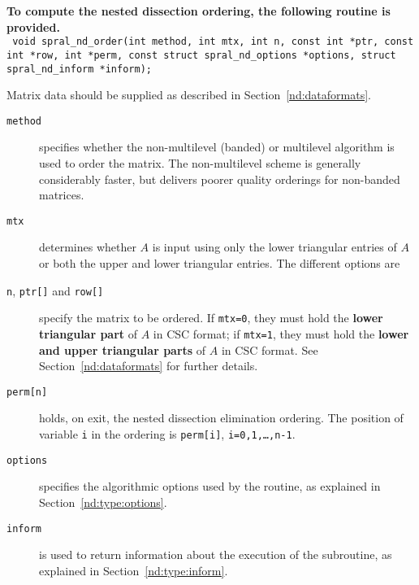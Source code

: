 {\bf To compute the nested dissection ordering, the following routine is provided.}
   \vspace*{0.3cm} \\
\texttt{\hspace*{0.2cm} void spral\_nd\_order(int method, int mtx, int n, const int *ptr, const int *row, int *perm, const struct spral\_nd\_options *options, struct spral\_nd\_inform *inform);}
\vspace{0.3em}

\noindent
Matrix data should be supplied as described in Section~\ref{nd:dataformats}. 

\noindent
\begin{description}

\item[\texttt{method}]
specifies whether the non-multilevel (banded) or multilevel algorithm is used
to order the matrix. The non-multilevel scheme is generally considerably faster,
but delivers poorer quality orderings for non-banded matrices.


\item[\texttt{mtx}]
determines whether $A$ is input using only the lower triangular entries 
of $A$ or both the upper and lower triangular entries. The different options are 

\item[\texttt{n}, \texttt{ptr[]} and \texttt{row[]}] specify the matrix to be
   ordered.
If {\tt mtx=0}, they must hold the \textbf{lower triangular part} of 
$A$ in CSC format;  if {\tt mtx=1}, they 
must hold the \textbf{lower and upper triangular parts} of $A$ in CSC format. 
See Section~\ref{nd:dataformats} for further details.

\item[\texttt{perm[n]}] holds, on exit, the nested dissection elimination ordering. 
The position of variable {\tt i} in the ordering is  {\tt perm[i]},
{\tt i=0,1,\ldots,n-1}.

\item[\texttt{options}] specifies the algorithmic options used by the routine,
   as explained in Section~\ref{nd:type:options}.

\item[\texttt{inform}] is used to return information about the execution
   of the subroutine, as explained in Section~\ref{nd:type:inform}.

\end{description}



